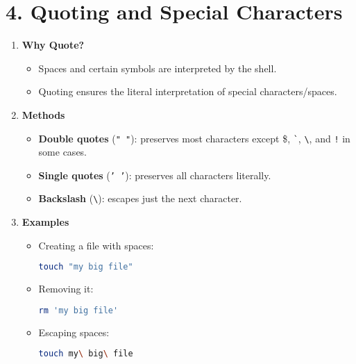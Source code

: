 \documentclass[a4paper]{report}
\begin{document}
\section*{4. Quoting and Special Characters}
\begin{enumerate}
    \item \textbf{Why Quote?}
    \begin{itemize}
        \item Spaces and certain symbols are interpreted by the shell.
        \item Quoting ensures the literal interpretation of special characters/spaces.
    \end{itemize}

    \item \textbf{Methods}
    \begin{itemize}
        \item \textbf{Double quotes} (\texttt{" "}): preserves most characters except \$, \texttt{\`}, \texttt{\textbackslash}, and \texttt{!} in some cases.
        \item \textbf{Single quotes} (\texttt{' '}): preserves all characters literally.
        \item \textbf{Backslash} (\texttt{\textbackslash}): escapes just the next character.
    \end{itemize}

    \item \textbf{Examples}
    \begin{itemize}
        \item Creating a file with spaces:
        \begin{lstlisting}[language=bash]
touch "my big file"
        \end{lstlisting}
        \item Removing it:
        \begin{lstlisting}[language=bash]
rm 'my big file'
        \end{lstlisting}
        \item Escaping spaces:
        \begin{lstlisting}[language=bash]
touch my\ big\ file
        \end{lstlisting}
    \end{itemize}
\end{enumerate}
\end{document}
